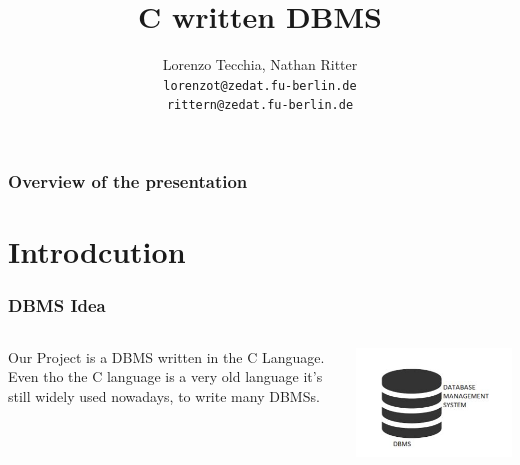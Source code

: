 \documentclass{beamer}
\title{C written DBMS}
\author[Tecchia, Ritter]{Lorenzo Tecchia, Nathan Ritter \\
\texttt{lorenzot@zedat.fu-berlin.de} \\
\texttt{rittern@zedat.fu-berlin.de}}
\institute[FU Berlin]{Freie Universität Berlin}
\begin{document}
\begin{frame}
	\maketitle
\end{frame}

\begin{frame}
	\frametitle{Overview of the presentation}
	\tableofcontents
\end{frame}

\section{Introdcution}
\begin{frame}
	\frametitle{DBMS Idea}
	\begin{columns}
	\begin{column}{0.4\textwidth}	
		Our Project is a DBMS written in the C Language. \\ Even tho the C language is a very old language it's still widely used nowadays, to write many DBMSs.
	\end{column}
	
	\begin{column}{0.4\textwidth}

\includegraphics[width=1.4\columnwidth]{th-1536893874.jpg}			
	
	\end{column}

	\end{columns}
\end{frame}
\end{document}
